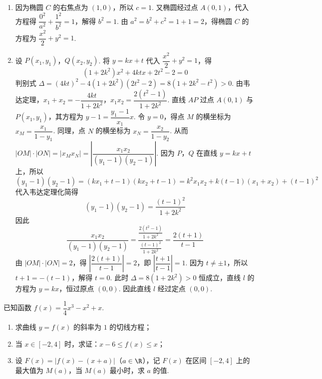 \begin{solution}
\begin{enumerate}
\item 因为椭圆 \(C\) 的右焦点为 \((1,0)\)，所以 \(c=1\).
又椭圆经过点 \(A(0,1)\)，代入方程得 \(\dfrac{0^2}{a^2}+\dfrac{1^2}{b^2}=1\)，解得 \(b^2=1\).
由 \(a^2=b^2+c^2=1+1=2\)，得椭圆 \(C\) 的方程为 \(\dfrac{x^2}{2}+y^2=1\).

\item 设 \(P(x_1,y_1)\)，\(Q(x_2,y_2)\). 将 \(y=kx+t\) 代入 \(\dfrac{x^2}{2}+y^2=1\)，得
\[
(1+2k^2)x^2+4ktx+2t^2-2=0
\]
判别式 \(\Delta=(4kt)^2-4(1+2k^2)(2t^2-2)=8(1+2k^2-t^2)>0\).
由韦达定理，\(x_1+x_2=-\dfrac{4kt}{1+2k^2}\)，\(x_1x_2=\dfrac{2(t^2-1)}{1+2k^2}\).
直线 \(AP\) 过点 \(A(0,1)\) 与 \(P(x_1,y_1)\)，其方程为 \(y-1=\dfrac{y_1-1}{x_1}x\). 令 \(y=0\)，得点 \(M\) 的横坐标为 \(x_M=\dfrac{x_1}{1-y_1}\). 同理，点 \(N\) 的横坐标为 \(x_N=\dfrac{x_2}{1-y_2}\).
从而 \(|OM|\cdot|ON|=|x_M x_N|=\left|\dfrac{x_1x_2}{(y_1-1)(y_2-1)}\right|\).
因为 \(P\)，\(Q\) 在直线 \(y=kx+t\) 上，所以
\[
(y_1-1)(y_2-1)=(kx_1+t-1)(kx_2+t-1)=k^2x_1x_2+k(t-1)(x_1+x_2)+(t-1)^2
\]
代入韦达定理化简得
\[
(y_1-1)(y_2-1)=\frac{(t-1)^2}{1+2k^2}
\]
因此
\[
\frac{x_1x_2}{(y_1-1)(y_2-1)}=\frac{\frac{2(t^2-1)}{1+2k^2}}{\frac{(t-1)^2}{1+2k^2}}=\frac{2(t+1)}{t-1}
\]
由 \(|OM|\cdot|ON|=2\)，得 \(\left|\dfrac{2(t+1)}{t-1}\right|=2\)，即 \(\left|\dfrac{t+1}{t-1}\right|=1\).
因为 \(t\ne\pm1\)，所以 \(t+1=-(t-1)\)，解得 \(t=0\).
此时 \(\Delta=8(1+2k^2)>0\) 恒成立，直线 \(l\) 的方程为 \(y=kx\)，恒过原点 \((0,0)\).
因此直线 \(l\) 经过定点 \((0,0)\).
\end{enumerate}
\end{solution}

\begin{problem}
已知函数 \(f(x)=\dfrac14x^3-x^2+x\).

\begin{enumerate}
\item 求曲线 \(y=f(x)\) 的斜率为 \(1\) 的切线方程；

\item 当 \(x\in\left[-2,4\right]\) 时，求证：\(x-6\le f(x)\le x\)；

\item 设 \(F(x)=\lvert f(x)-(x+a)\rvert\)（\(a\in\R\)），记 \(F(x)\) 在区间 \(\left[-2,4\right]\) 上的最大值为 \(M(a)\)，当 \(M(a)\) 最小时，求 \(a\) 的值.
\end{enumerate}
\end{problem}

